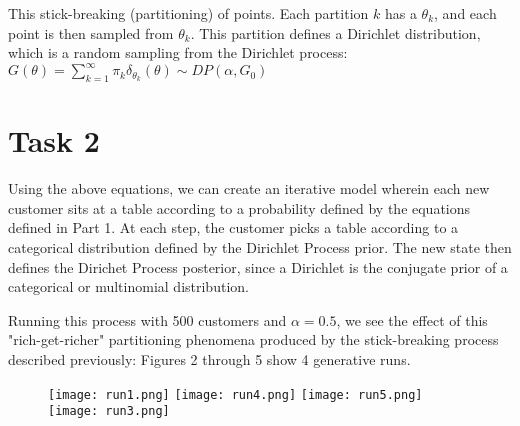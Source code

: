 \documentclass[letterpaper, 10pt]{article}
\begin{document}
This stick-breaking (partitioning) of points. Each partition $k$ has a $\theta_k$, and each point is then sampled from $\theta_k$. This partition defines a Dirichlet distribution, which is a random sampling from the Dirichlet process: $G(\theta) = \sum_{k=1}^{\infty} \pi_k \delta_{\theta_k}(\theta) \sim DP(\alpha, G_0)$


\section{Task 2}
Using the above equations, we can create an iterative model wherein each new customer sits at a table according to a probability defined by the equations defined in Part 1. At each step, the customer picks a table according to a categorical distribution defined by the Dirichlet Process prior. The new state then defines the Dirichet Process posterior, since a Dirichlet is the conjugate prior of a categorical or multinomial distribution. 

Running this process with 500 customers and $\alpha = 0.5$, we see the effect of this "rich-get-richer" partitioning phenomena produced by the stick-breaking process described previously: Figures 2 through 5 show 4 generative runs.

\begin{figure}[h]
    \centering
    \texttt{[image: run1.png]}
    \label{2}
    \texttt{[image: run4.png]}
    \label{3}
    \texttt{[image: run5.png]}
    \label{4}
    \texttt{[image: run3.png]}
    \label{4}
\end{figure}
\end{document}
